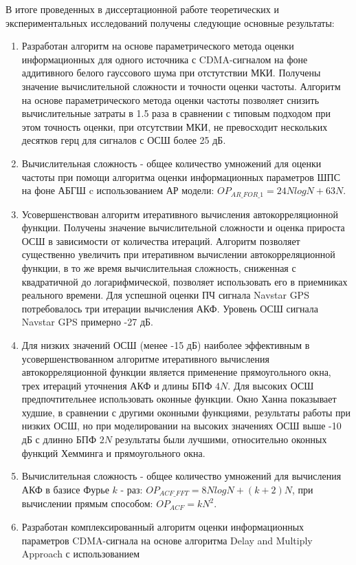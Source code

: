 В итоге проведенных в диссертационной работе теоретических и экспериментальных исследований получены следующие основные результаты:
\begin{enumerate}
	\item Разработан алгоритм на основе параметрического метода оценки информационных для одного источника с CDMA-сигналом на фоне аддитивного белого гауссового шума при отстутствии МКИ.
		Получены значение вычислительной сложности и точности оценки частоты. Алгоритм на основе параметрического метода оценки частоты позволяет снизить вычислительные
		затраты в 1.5 раза в сравнении с типовым подходом при этом точность оценки, при отсутствии МКИ, не превосходит нескольких десятков герц для сигналов
		с ОСШ более 25 дБ.
	\item Вычислительная сложность - общее количество умножений для оценки частоты при помощи алгоритма оценки информационных параметров ШПС на фоне АБГШ c использованием АР модели:
		${OP_{AR\_FOR\_1} = 24NlogN + 63N}$.	
	\item Усовершенствован алгоритм итеративного вычисления автокорреляционной функции. Получены значение вычислительной сложности и оценка
		прироста ОСШ в зависимости от количества итераций. Алгоритм позволяет существенно увеличить при итеративном вычислении
		автокорреляционной функции, в то же время вычислительная сложность, сниженная с квадратичной до логарифмической,
		позволяет использовать его в приемниках реального времени. Для успешной оценки ПЧ сигнала Navstar GPS потребовалось три итерации вычисления АКФ.
		Уровень ОСШ сигнала Navstar GPS примерно -27 дБ.
	\item Для низких значений ОСШ (менее -15 дБ) наиболее эффективным в усовершенствованном алгоритме итеративного вычисления автокорреляционной функции
		является применение прямоугольного окна, трех итераций уточнения АКФ и длины БПФ ${4N}$.
		Для высоких ОСШ предпочтительнее использовать оконные функции. Окно Ханна показывает худшие, в сравнении с другими оконными функциями,
		результаты работы при низких ОСШ, но при моделировании на высоких значениях ОСШ выше -10 дБ с длинно БПФ ${2N}$ результаты были лучшими,
		относительно оконных функций Хемминга и прямоугольного окна.
	\item Вычислительная сложность - общее количество умножений для вычисления АКФ в базисе Фурье ${k}$ - раз: ${OP_{ACF\_FFT}=8NlogN + (k+2)N}$, при вычислении
		прямым способом: ${OP_{ACF}=kN^2}$.
	\item Разработан комплексированный алгоритм оценки информационных параметров CDMA-сигнала на основе алгоритма Delay and Multiply Approach с использованием

\end{enumerate}
